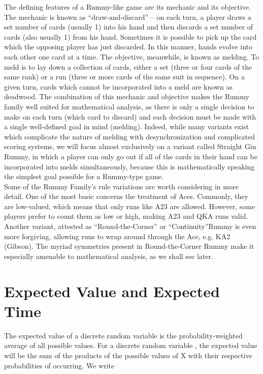 \documentclass[paper=a4, fontsize=11pt,twoside]{report}   %
\begin{document}
The defining features of a Rummy-like game are its mechanic and its objective. The mechanic is known as “draw-and-discard” – on each turn, a player draws a set number of cards (usually 1) into his hand and then discards a set number of cards (also usually 1) from his hand. Sometimes it is possible to pick up the card which the opposing player has just discarded. In this manner, hands evolve into each other one card at a time. The objective, meanwhile, is known as melding. To meld is to lay down a collection of cards, either a set (three or four cards of the same rank) or a run (three or more cards of the same suit in sequence). On a given turn, cards which cannot be incorporated into a meld are known as deadwood. The combination of this mechanic and objective makes the Rummy family well suited for mathematical analysis, as there is only a single decision to make on each turn (which card to discard) and each decision must be made with a single well-defined goal in mind (melding). Indeed, while many variants exist which complicate the nature of melding with desynchronization and complicated scoring systems, we will focus almost exclusively on a variant called Straight Gin Rummy, in which a player can only go out if all of the cards in their hand can be incorporated into melds simultaneously, because this is mathematically speaking the simplest goal possible for a Rummy-type game.\\

Some of the Rummy Family’s rule variations are worth considering in more detail. One of the most basic concerns the treatment of Aces. Commonly, they are low-valued, which means that only runs like A23 are allowed. However, some players prefer to count them as low or high, making A23 and QKA runs valid. Another variant, attested as “Round-the-Corner” or “Continuity”Rummy is even more forgiving, allowing runs to wrap around through the Ace, e.g. KA2 (Gibson). The myriad symmetries present in Round-the-Corner Rummy make it especially amenable to mathematical analysis, as we shall see later. \\
 
\section{Expected Value and Expected Time}

The expected value of a discrete random variable is the probability-weighted average of all possible values. For a discrete random variable , the expected value will be the sum of the products of the possible values of X with their respective probabilities of occurring. We write\\
\end{document}

